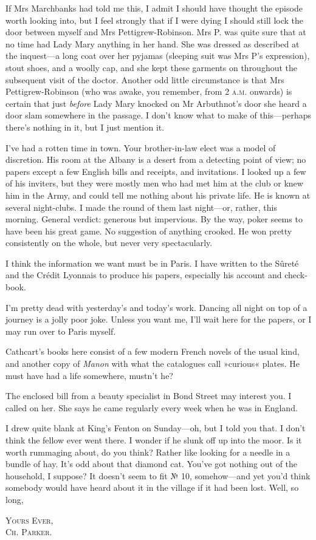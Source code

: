 If Mrs Marchbanks had told me this, I admit I should have thought the episode worth looking into, but I feel strongly that if I were dying I should still lock the door between myself and Mrs Pettigrew-Robinson.  Mrs P. was quite sure that at no time had Lady Mary anything in her hand. She was dressed as described at the inquest\allowbreak---\allowbreak a long coat over her pyjamas (sleeping suit was Mrs P's expression), stout shoes, and a woolly cap, and she kept these garments on throughout the subsequent visit of the doctor. Another odd little circumstance is that Mrs  Pettigrew-Robinson (who was awake, you remember, from 2 \textsc{a.m.} onwards) is certain that just \textit{before} Lady Mary knocked on Mr Arbuthnot's door she heard a door slam somewhere in the passage. I don't know what to make of this\allowbreak---\allowbreak perhaps there's nothing in it, but I just mention it.

I've had a rotten time in town. Your brother-in-law elect was a model of discretion. His room at the Albany is a desert from a detecting point of view; no papers except a few English bills and receipts, and invitations. I looked up a few of his inviters, but they were mostly men who had met him at the club or knew him in the Army, and could tell me nothing about his private life. He is known at several night-clubs. I made the round of them last night\allowbreak---\allowbreak or, rather, this morning. General verdict: generous but impervious. By the way, poker seems to have been his great game. No suggestion of anything crooked.  He won pretty consistently on the whole, but never very spectacularly.

I think the information we want must be in Paris. I have written to the Sûreté and the Crédit Lyonnais to produce his papers, especially his account and check-book.

I'm pretty dead with yesterday's and today's work. Dancing all night on top of a journey is a jolly poor joke. Unless you want me, I'll wait here for the papers, or I may run over to Paris myself.

Cathcart's books here consist of a few modern French novels of the usual kind, and another copy of \textit{Manon} with what the catalogues call »curious« plates. He must have had a life somewhere, mustn't he?

The enclosed bill from a beauty specialist in Bond Street may interest you. I called on her. She says he came regularly every week when he was in England.

I drew quite blank at King's Fenton on Sunday\allowbreak---\allowbreak oh, but I told you that. I don't think the fellow ever went there. I wonder if he slunk off up into the moor. Is it worth rummaging about, do you think?  Rather like looking for a needle in a bundle of hay. It's odd about that diamond cat. You've got nothing out of the household, I suppose?  It doesn't seem to fit № 10, somehow\allowbreak---\allowbreak and yet you'd think somebody would have heard about it in the village if it had been lost. Well, so long,

\begin{flushright}
\textsc{Yours Ever,}\\
\textsc{Ch. Parker.}
\end{flushright}
